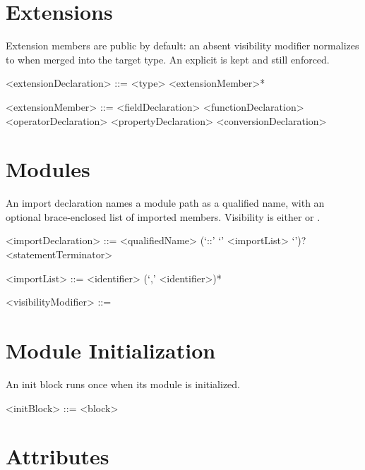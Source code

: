 \documentclass[makeidx]{article}
\begin{document}
\section{Extensions}

\LMHash{}%
Extension members are public by default: an absent visibility modifier
normalizes to  when merged into the target type.
An explicit  is kept and still enforced.

\begin{grammar}
<extensionDeclaration> ::= \EXTEND{} <type> \DO{}
  \gnewline{} <extensionMember>* \END{}

<extensionMember> ::= <fieldDeclaration>
  \alt <functionDeclaration>
  \alt <operatorDeclaration>
  \alt <propertyDeclaration>
  \alt <conversionDeclaration>
\end{grammar}

\section{Modules}

\LMHash{}%
An import declaration names a module path as a qualified name, with an
optional brace-enclosed list of imported members.
Visibility is either  or .

\begin{grammar}
<importDeclaration> ::= \IMPORT{} <qualifiedName>
  \gnewline{} (`::' `{' <importList> `}')? <statementTerminator>

<importList> ::= <identifier> (`,' <identifier>)*

<visibilityModifier> ::= \PUBLIC{}
  \alt \PRIVATE{}
\end{grammar}

\section{Module Initialization}

\LMHash{}%
An init block runs once when its module is initialized.

\begin{grammar}
<initBlock> ::= \INIT{} <block>
\end{grammar}

\section{Attributes}
\end{document}
